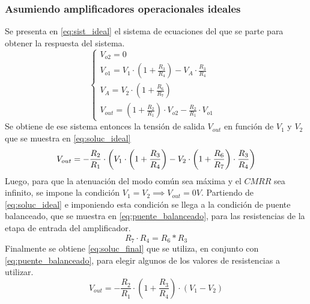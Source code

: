 \subsubsection{Asumiendo amplificadores operacionales ideales}
Se presenta en \ref{eq:sist_ideal} el sistema de ecuaciones del que se parte para obtener la respuesta del sistema.
\begin{equation}
        \left\{
            \begin{array}{llll}
                
                V_{o2} = 0 &\\
                
                V_{o1} = V_{1}\cdot \left(1+\frac{R_3}{R_4}\right) - V_A\cdot\frac{R_3}{R_4}\\
                
                V_A = V_2\cdot \left(1+\frac{R_6}{R_7}\right)\\
                
                V_{out} = \left(1+\frac{R_2}{R_1}\right)\cdot V_{o2} -  \frac{R_2}{R_1} \cdot V_{o1}
            \end{array}
        \right.
  \label{eq:sist_ideal}
\end{equation}
Se obtiene de ese sistema entonces la tensi\'on de salida $V_{out}$ en funci\'on de $V_1 $ y $V_2$ que se muestra en \ref{eq:soluc_ideal}
\begin{equation}
    V_{out} =  -  \frac{R_2}{R_1} \cdot \left(V_{1}\cdot \left(1+\frac{R_3}{R_4}\right) - V_2\cdot \left(1+\frac{R_6}{R_7}\right)\cdot\frac{R_3}{R_4}\\\right)
    \label{eq:soluc_ideal}
\end{equation}
Luego, para que la atenuaci\'on del modo com\'un  sea m\'axima y el $CMRR$ sea infinito, se impone la condici\'on $V_1 = V_2 \implies V_{out} = 0V$. Partiendo de \ref{eq:soluc_ideal} e imponiendo esta condici\'on se llega a la condici\'on de puente balanceado, que se muestra en \ref{eq:puente_balanceado}, para las resistencias de la etapa de entrada del amplificador.
\begin{equation}
    R_7\cdot R_4 = R_6 * R_3
    \label{eq:puente_balanceado}
\end{equation}
Finalmente se obtiene \ref{eq:soluc_final} que se utiliza, en conjunto con \ref{eq:puente_balanceado}, para elegir algunos de los valores de resistencias a utilizar.
\begin{equation}
    V_{out} = -\frac{R_2}{R_1} \cdot \left(1+\frac{R_3}{R_4}\right)\cdot \left(V_1-V_2\right)
    \label{eq:soluc_final}
\end{equation}
